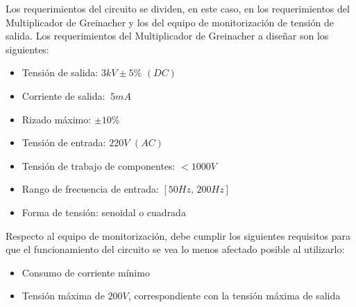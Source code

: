 Los requerimientos del circuito se dividen, en este caso, en los requerimientos del Multiplicador de Greinacher y los del equipo de monitorización
de tensión de salida. Los requerimientos del Multiplicador de Greinacher a diseñar son los siguientes:

\begin{itemize}
    \item Tensión de salida: $3kV \pm 5\%\,\, \left(DC\right)$
    \item Corriente de salida: $~5mA$
    \item Rizado máximo: $\pm 10\%$
    \item Tensión de entrada: $220V\,\, \left(AC\right)$
    \item Tensión de trabajo de componentes: $<1000V$
    \item Rango de frecuencia de entrada: $\left[50Hz,\, 200Hz\right]$
    \item Forma de tensión: senoidal o cuadrada
\end{itemize}

Respecto al equipo de monitorización, debe cumplir los siguientes requisitos para que el funcionamiento del circuito se vea 
lo menos afectado posible al utilizarlo:

\begin{itemize}
    \item Consumo de corriente mínimo
    \item Tensión máxima de $200V$, correspondiente con la tensión máxima de salida
\end{itemize}
